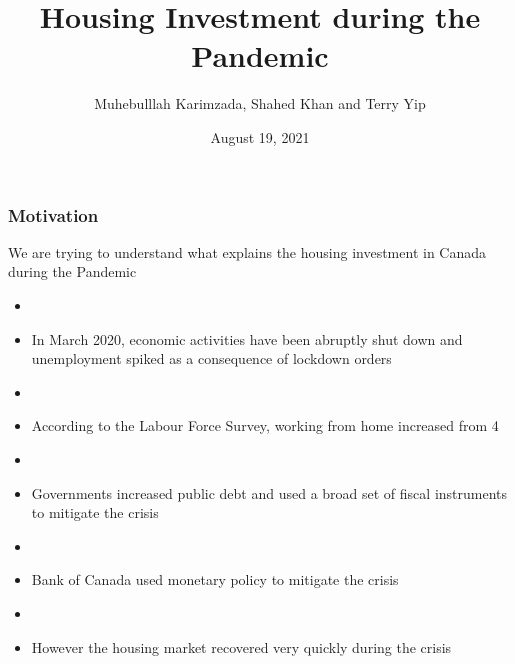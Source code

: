 \documentclass[blue]{beamer}
\title{Housing Investment during the Pandemic}
\subtitle{ }
\author[Karimzada, Khan and Yip]{Muhebulllah Karimzada, Shahed Khan and Terry Yip}
\institute{\textit{McMaster U., Western U. and McMaster U.}}
\date[ ]{August 19, 2021}
\begin{document}
\frame{\titlepage}
\label{moti1}
\begin{frame} \frametitle{Motivation}
  We are trying to understand what explains the housing investment in Canada during the Pandemic 
 		 	\begin{itemize}	
 		 	    \item []
 		\item 	In March 2020, economic activities have been abruptly shut down and unemployment spiked as a consequence of lockdown orders \hfill \hyperlink{unemployment}{} 
 		   \item []
 		   \item According to the  Labour Force Survey, working from home increased from 4%
 		   \item []
 		\item  Governments increased public debt and used a broad set of  fiscal instruments to mitigate the crisis 
 		   \item []
 		   \item Bank of Canada used monetary policy to mitigate the crisis  \hfill \hyperlink{bank_rate}{} 
 		   \item []
 		\item However the housing market recovered very quickly during the crisis \hfill \hyperlink{price}{} 
          \end{itemize}
        
\end{frame}
\end{document}
